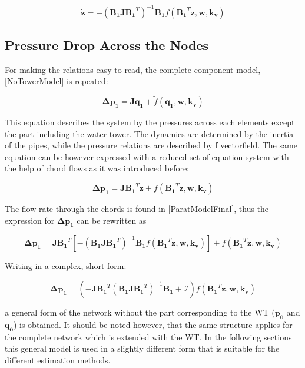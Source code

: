 \begin{equation}
   \pmb{\dot{z}}  = - (\pmb{B_1 J {B_1}}^T)^{-1}\pmb{B_1} f({\pmb{B_1}}^T \pmb{z},\pmb{ w}, \pmb{k_v})
   \label{ParatModelFinal}
 \end{equation}

\subsection{Pressure Drop Across the Nodes}
\label{ModelRelationSection}

For making the relations easy to read, the complete component model, \eqref{NoTowerModel} is repeated: 

\begin{equation}
  \pmb{\Delta p_1} =  \pmb{J} \pmb{\dot{q}_1} + \tilde{f}(\pmb{q_1}, \pmb{w}, \pmb{k_v})
  \label{RecallModel}
\end{equation}

This equation describes the system by the pressures across each elements except the part including the water tower. The dynamics are determined by the inertia of the pipes, while the pressure relations are described by f vectorfield. 
The same equation can be however expressed with a reduced set of equation system with the help of chord flows as it was introduced before: 

\begin{equation}
  \pmb{\Delta p_1} =  \pmb{J {B_1}}^T \pmb{\dot{z}} + f({\pmb{B_1}}^T \pmb{z}, \pmb{w}, \pmb{k_v})
 \end{equation}

The flow rate through the chords is found in \eqref{ParatModelFinal}, thus the expression for $ \pmb{\Delta p_1} $ can be rewritten as

\begin{equation}
 \pmb{ \Delta p_1} = \pmb{ J {B_1}}^T [- (\pmb{B_1 J {B_1}}^T)^{-1}\pmb{B_1} f({\pmb{B_1}}^T \pmb{z},\pmb{ w}, \pmb{k_v})] + f({\pmb{B_1}}^T \pmb{z},\pmb{ w}, \pmb{k_v})
  \label{PressureLarge}
 \end{equation}
 
Writing in a complex, short form:
 
 \begin{equation}
  \pmb{\Delta p_1} =  (-\pmb{J {B_1}}^T (\pmb{B_1 J {B_1}}^T)^{-1}\pmb{B_1} + \pmb{\mathcal{I}}) f({\pmb{B_1}}^T \pmb{z}, \pmb{w}, \pmb{k_v})
  \label{PressureShort}
 \end{equation}

a general form of the network without the part corresponding to the WT ($\pmb{p_0}$ and $\pmb{q_0}$) is obtained. It should be noted however, that the same structure applies for the complete network which is extended with the WT. In the following sections this general model is used in a slightly different form that is suitable for the different estimation methods. 

